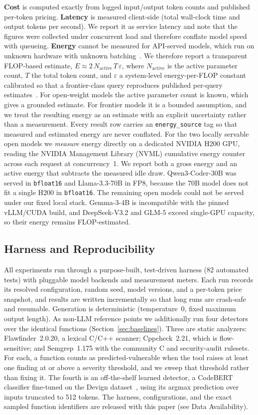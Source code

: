 \documentclass[computers,article,submit,moreauthors]{Definitions/mdpi}
\begin{document}
\textbf{Cost} is computed exactly from logged input/output token counts and published per-token pricing. \textbf{Latency} is measured client-side (total wall-clock time and output tokens per second). We report it as service latency and note that the figures were collected under concurrent load and therefore conflate model speed with queueing. \textbf{Energy} cannot be measured for API-served models, which run on unknown hardware with unknown batching~\citep{jegham}. We therefore report a transparent FLOP-based estimate, $E \approx 2\,N_\text{active}\,T\,\varepsilon$, where $N_\text{active}$ is the active parameter count, $T$ the total token count, and $\varepsilon$ a system-level energy-per-FLOP constant calibrated so that a frontier-class query reproduces published per-query estimates~\citep{jegham}. For open-weight models the active parameter count is known, which gives a grounded estimate. For frontier models it is a bounded assumption, and we treat the resulting energy as an estimate with an explicit uncertainty rather than a measurement. Every result row carries an \texttt{energy\_source} tag so that measured and estimated energy are never conflated. For the two locally servable open models we \emph{measure} energy directly on a dedicated NVIDIA H200 GPU, reading the NVIDIA Management Library (NVML) cumulative energy counter~\citep{parttime,samsi} across each request at concurrency~1. We report both a gross energy and an active energy that subtracts the measured idle draw. Qwen3-Coder-30B was served in \texttt{bfloat16} and Llama-3.3-70B in FP8, because the 70B model does not fit a single H200 in \texttt{bfloat16}. The remaining open models could not be served under our fixed local stack. Gemma-3-4B is incompatible with the pinned vLLM/CUDA build, and DeepSeek-V3.2 and GLM-5 exceed single-GPU capacity, so their energy remains FLOP-estimated.

\subsection{Harness and Reproducibility}\label{sec:harness}
All experiments run through a purpose-built, test-driven harness (82 automated tests) with pluggable model backends and measurement meters. Each run records its resolved configuration, random seed, model versions, and a per-token price snapshot, and results are written incrementally so that long runs are crash-safe and resumable. Generation is deterministic (temperature~0, fixed maximum output length). As non-LLM reference points we additionally run four detectors over the identical functions (Section~\ref{sec:baselines}). Three are static analyzers: Flawfinder~2.0.20, a lexical C/C++ scanner; Cppcheck~2.21, which is flow-sensitive; and Semgrep~1.175 with the community C and security-audit rulesets. For each, a function counts as predicted-vulnerable when the tool raises at least one finding at or above a severity threshold, and we sweep that threshold rather than fixing it. The fourth is an off-the-shelf learned detector, a CodeBERT classifier fine-tuned on the Devign dataset~\citep{devign}, using its argmax prediction over inputs truncated to 512 tokens. The harness, configurations, and the exact sampled function identifiers are released with this paper (see Data Availability).
\end{document}
